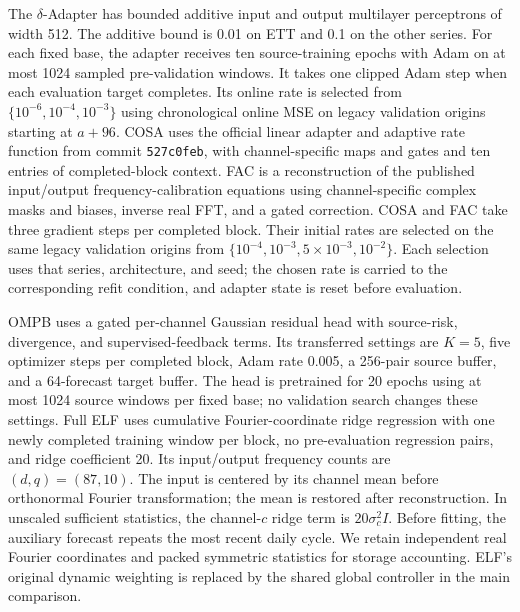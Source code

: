 The $\delta$-Adapter has bounded additive input and output multilayer perceptrons of width 512. The additive bound is 0.01 on ETT and 0.1 on the other series. For each fixed base, the adapter receives ten source-training epochs with Adam on at most 1024 sampled pre-validation windows. It takes one clipped Adam step when each evaluation target completes. Its online rate is selected from $\{10^{-6},10^{-4},10^{-3}\}$ using chronological online MSE on legacy validation origins starting at $a+96$. COSA uses the official linear adapter and adaptive rate function from commit \texttt{527c0feb}, with channel-specific maps and gates and ten entries of completed-block context. FAC is a reconstruction of the published input/output frequency-calibration equations using channel-specific complex masks and biases, inverse real FFT, and a gated correction. COSA and FAC take three gradient steps per completed block. Their initial rates are selected on the same legacy validation origins from $\{10^{-4},10^{-3},5\times10^{-3},10^{-2}\}$. Each selection uses that series, architecture, and seed; the chosen rate is carried to the corresponding refit condition, and adapter state is reset before evaluation.

OMPB uses a gated per-channel Gaussian residual head with source-risk, divergence, and supervised-feedback terms. Its transferred settings are $K=5$, five optimizer steps per completed block, Adam rate 0.005, a 256-pair source buffer, and a 64-forecast target buffer. The head is pretrained for 20 epochs using at most 1024 source windows per fixed base; no validation search changes these settings. Full ELF uses cumulative Fourier-coordinate ridge regression with one newly completed training window per block, no pre-evaluation regression pairs, and ridge coefficient 20. Its input/output frequency counts are $(d,q)=(87,10)$. The input is centered by its channel mean before orthonormal Fourier transformation; the mean is restored after reconstruction. In unscaled sufficient statistics, the channel-$c$ ridge term is $20\sigma_c^2 I$. Before fitting, the auxiliary forecast repeats the most recent daily cycle. We retain independent real Fourier coordinates and packed symmetric statistics for storage accounting. ELF's original dynamic weighting is replaced by the shared global controller in the main comparison.

